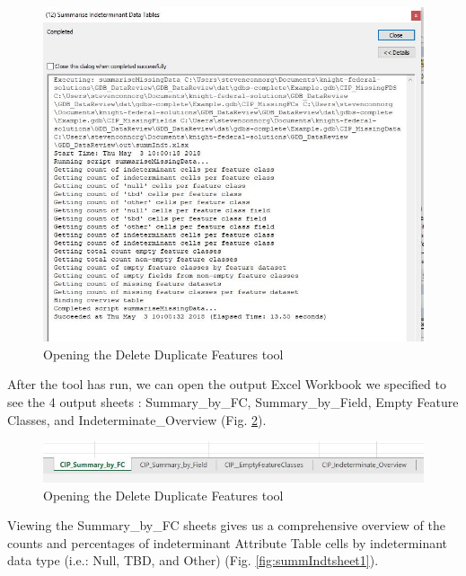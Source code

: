 \documentclass[openany]{book}
\theoremstyle{definition}
\theoremstyle{definition}
\theoremstyle{definition}
\theoremstyle{remark}
\begin{document}
\begin{figure}[H]

{\centering \includegraphics{figures/summIndt-messages} 

}

\caption{Opening the Delete Duplicate Features tool}\label{fig:summIndtmessages}
\end{figure}

After the tool has run, we can open the output Excel Workbook we
specified to see the 4 output sheets : Summary\_by\_FC,
Summary\_by\_Field, Empty Feature Classes, and Indeterminate\_Overview
(Fig. \ref{fig:summIndtsheets}).

\begin{figure}[H]

{\centering \includegraphics{figures/summIndt-sheets} 

}

\caption{Opening the Delete Duplicate Features tool}\label{fig:summIndtsheets}
\end{figure}

Viewing the Summary\_by\_FC sheets gives us a comprehensive overview of
the counts and percentages of indeterminant Attribute Table cells by
indeterminant data type (i.e.: Null, TBD, and Other) (Fig.
\ref{fig:summIndtsheet1}).
\end{document}
